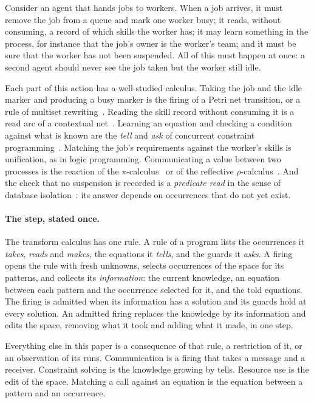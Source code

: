 \documentclass[11pt]{article}
\theoremstyle{plain}
\theoremstyle{definition}
\theoremstyle{remark}
\begin{document}
Consider an agent that hands jobs to workers. When a job arrives, it must remove the job from a
queue and mark one worker busy; it reads, without consuming, a record of which skills the worker
has; it may learn something in the process, for instance that the job's owner is the worker's
team; and it must be sure that the worker has not been suspended. All of this must happen at
once: a second agent should never see the job taken but the worker still idle.

Each part of this action has a well-studied calculus. Taking the job and the idle marker and
producing a busy marker is the firing of a Petri net transition, or a rule of multiset
rewriting~\cite{banatre-metayer-gamma,berry-boudol-cham}. Reading the skill record without
consuming it is a read arc of a contextual net~\cite{montanari-rossi-contextual}. Learning an
equation and checking a condition against what is known are the \emph{tell} and \emph{ask} of
concurrent constraint programming~\cite{saraswat-rinard-ccp}. Matching the job's requirements
against the worker's skills is unification, as in logic programming. Communicating a value
between two processes is the reaction of the $\pi$-calculus~\cite{milner-parrow-walker} or of
the reflective $\rho$-calculus~\cite{meredith-radestock-rho}. And the check that no suspension
is recorded is a \emph{predicate read} in the sense of database
isolation~\cite{eswaran-predicate-locks}: its answer depends on occurrences that do not yet
exist.

\paragraph{The step, stated once.} The transform calculus has one rule. A rule of a program
lists the occurrences it \emph{takes}, \emph{reads} and \emph{makes}, the equations it
\emph{tells}, and the guards it \emph{asks}. A firing opens the rule with fresh unknowns, selects
occurrences of the space for its patterns, and collects its \emph{information}: the current
knowledge, an equation between each pattern and the occurrence selected for it, and the told
equations. The firing is admitted when its information has a solution and its guards hold at
every solution. An admitted firing replaces the knowledge by its information and edits the space,
removing what it took and adding what it made, in one step.

Everything else in this paper is a consequence of that rule, a restriction of it, or an
observation of its runs. Communication is a firing that takes a message and a receiver.
Constraint solving is the knowledge growing by tells. Resource use is the edit of the space.
Matching a call against an equation is the equation between a pattern and an occurrence.
\end{document}
